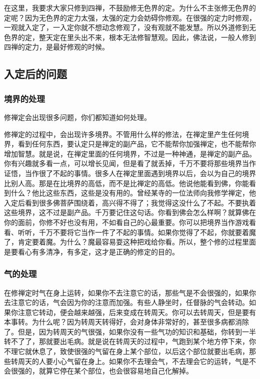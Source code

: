 \documentclass{book}
\begin{document}
在这里，我要求大家只修到四禅，不鼓励修无色界的定。为什么不主张修无色界的定呢？因为无色界的定力太强，太强的定力会妨碍你修观。在很强的定力时修观，一观就入定了，一入定你就不想动念修观了，没有观就不能发慧。所以外道修到无色界的定，整天定在里头出不来，根本无法修智慧观。因此，佛法说，一般人修到四禅的定力，是最好修观的时候。

\subsection{入定后的问题}

\subsubsection{境界的处理}

修禅定会出现很多问题，你们都知道如何处理。

修禅定的过程中，会出现许多境界。不管用什么样的修法，在禅定里产生任何境界，看到任何东西，要认定只是禅定的副产品，它不能帮你加强禅定，也不能帮你增加智慧。就是说，在禅定里面的任何境界，不过是一种神通，是禅定的副产品。你有兴趣就多看一点，可以增长见闻，但是看了就丢掉，千万不要将那些境界当作证悟，当作很了不起的事情。很多人在禅定里面遇到境界以后，会以为自己的境界比别人高。那是在比境界的高低，而不是比禅定的高低。他说他能看到佛，你能看到什么？他比这些东西，这些是没有用的。曾经某寺的一位法师向我修学禅定，他入定后看到很多佛菩萨围绕着，高兴得不得了；我觉得这没什么了不起。不要执着这些境界，这不过是副产品。千万要记住这句话。你看到佛会怎么样啊？就算佛在你的面前，你修不好也没有用，不如看自己的心最重要。你可以把境界当作游戏看看、听听，千万不要将它当作一件了不起的事情。如果你觉得了不起，你就要着魔了，肯定要着魔。为什么？魔最容易耍这种把戏给你看。所以，整个修的过程里面是要看心有多清净，有多定，这才是正确的修定的目的。

\subsubsection{气的处理}

在修禅定时气在身上运转，如果你不去注意它的话，那些气是不会很强的，如果你去注意它的话，气会因为你的注意而加强。有些人静坐时，任督脉的气会转动。如果你注意它转动，便会越来越强，后来变成在转周天。你可以去转周天，但是要有本事转。为什么呢？因为转周天转得好，会对身体非常好的，甚至很多病都消除了。但是，因为转周天的气很强，如果你没有一些气功的知识和基础，你转到一半转不了了，那就要出毛病。就是说在转周天的过程中，气跑到某个地方停下来，你不理它就休息了，致使很强的气留在身上某个部位，以后这个部位就要出毛病，那些转周天的人要小心气留在身上。如果你不去理会气，不去理会它的运转，气是不会很强的，就算它停在某个部位，也会很容易地自己化解掉。
\end{document}
